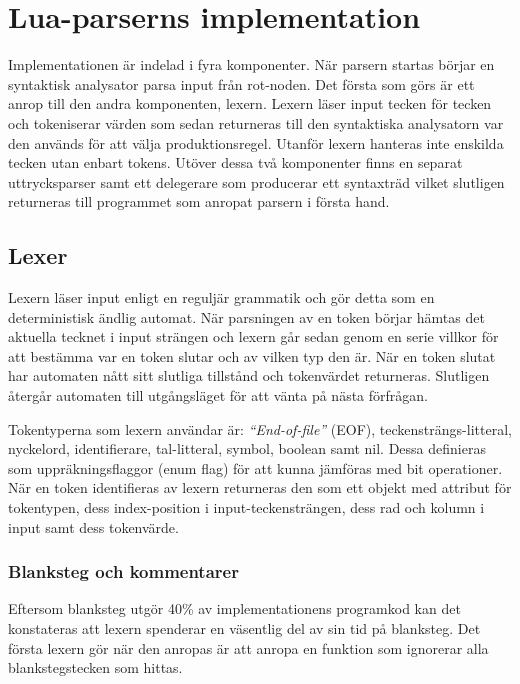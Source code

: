 \section{Lua-parserns implementation}

Implementationen är indelad i fyra komponenter. När parsern startas börjar
en syntaktisk analysator parsa input från rot-noden.  Det första som görs är
ett anrop till den andra komponenten, lexern. Lexern läser input tecken för
tecken och tokeniserar värden som sedan returneras till den syntaktiska
analysatorn var den används för att välja produktionsregel. Utanför lexern
hanteras inte enskilda tecken utan enbart tokens.  Utöver dessa två
komponenter finns en separat uttrycksparser samt ett delegerare som producerar
ett syntaxträd vilket slutligen returneras till programmet som anropat parsern
i första hand.

\subsection{Lexer}

Lexern läser input enligt en reguljär grammatik och gör detta som en
deterministisk ändlig automat. När parsningen av en token börjar hämtas det
aktuella tecknet i input strängen och lexern går sedan genom en serie villkor
för att bestämma var en token slutar och av vilken typ den är. När en token
slutat har automaten nått sitt slutliga tillstånd och tokenvärdet returneras.
Slutligen återgår automaten till utgångsläget för att vänta på nästa
förfrågan.

Tokentyperna som lexern användar är: \textit{``End-of-file''} (EOF),
teckensträngs-litteral, nyckelord, identifierare, tal-litteral, symbol,
boolean samt nil. Dessa definieras som uppräkningsflaggor (enum flag) för att
kunna jämföras med bit operationer. När en token identifieras av lexern
returneras den som ett objekt med attribut för tokentypen, dess index-position
i input-teckensträngen, dess rad och kolumn i input samt dess tokenvärde.

\subsubsection{Blanksteg och kommentarer}

Eftersom blanksteg utgör 40\% av implementationens programkod kan det
konstateras att lexern spenderar en väsentlig del av sin tid på blanksteg. Det
första lexern gör när den anropas är att anropa en funktion som ignorerar alla
blankstegstecken som hittas.

